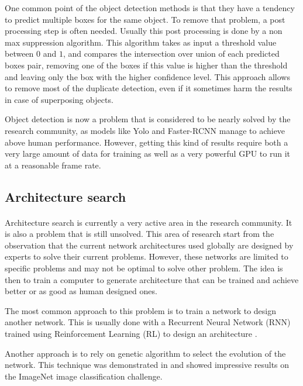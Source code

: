One common point of the object detection methods is that they have a tendency to predict multiple boxes for the same object. To remove that problem, a post processing step is often needed. Usually this post processing is done by a non max suppression algorithm. This algorithm takes as input a threshold value between $0$ and $1$, and compares the intersection over union of each predicted boxes pair, removing one of the boxes if this value is higher than the threshold and leaving only the box with the higher confidence level. This approach allows to remove most of the duplicate detection, even if it sometimes harm the results in case of superposing objects.

Object detection is now a problem that is considered to be nearly solved by the research community, as models like Yolo and Faster-RCNN manage to achieve above human performance. However, getting this kind of results require both a very large amount of data for training as well as a very powerful GPU to run it at a reasonable frame rate.


\subsection{Architecture search} \label{architectureSearch}
\paragraph{}
Architecture search is currently a very active area in the research community. It is also a problem that is still unsolved. This area of research start from the observation that the current network architectures used globally are designed by experts to solve their current problems. However, these networks are limited to specific problems and may not be optimal to solve other problem. The idea is then to train a computer to generate architecture that can be trained and achieve better or as good as human designed ones.

The most common approach to this problem is to train a network to design another network. This is usually done with a Recurrent Neural Network (RNN) trained using Reinforcement Learning (RL) to design an architecture \cite{zoph2016neural}.

Another approach is to rely on genetic algorithm to select the evolution of the network. This technique was demonstrated in \cite{real2019regularized} and showed impressive results on the ImageNet \cite{deng2009imagenet} image classification challenge. 

